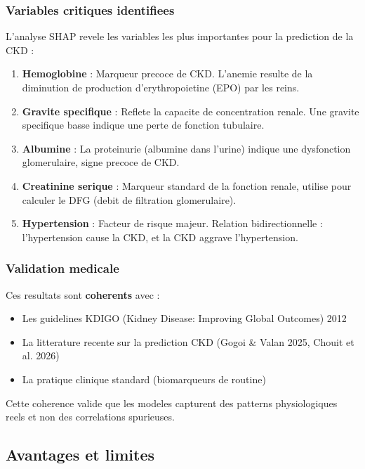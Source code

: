 \subsubsection{Variables critiques identifiees}

L'analyse SHAP revele les variables les plus importantes pour la prediction de la CKD :

\begin{enumerate}
    \item \textbf{Hemoglobine} : Marqueur precoce de CKD. L'anemie resulte de la diminution de production d'erythropoietine (EPO) par les reins.
    
    \item \textbf{Gravite specifique} : Reflete la capacite de concentration renale. Une gravite specifique basse indique une perte de fonction tubulaire.
    
    \item \textbf{Albumine} : La proteinurie (albumine dans l'urine) indique une dysfonction glomerulaire, signe precoce de CKD.
    
    \item \textbf{Creatinine serique} : Marqueur standard de la fonction renale, utilise pour calculer le DFG (debit de filtration glomerulaire).
    
    \item \textbf{Hypertension} : Facteur de risque majeur. Relation bidirectionnelle : l'hypertension cause la CKD, et la CKD aggrave l'hypertension.
\end{enumerate}

\subsubsection{Validation medicale}

Ces resultats sont \textbf{coherents} avec :
\begin{itemize}
    \item Les guidelines KDIGO (Kidney Disease: Improving Global Outcomes) 2012
    \item La litterature recente sur la prediction CKD (Gogoi \& Valan 2025, Chouit et al. 2026)
    \item La pratique clinique standard (biomarqueurs de routine)
\end{itemize}

Cette coherence valide que les modeles capturent des patterns physiologiques reels et non des correlations spurieuses.

\subsection{Avantages et limites}
\label{ssec:cas4-avantages}

